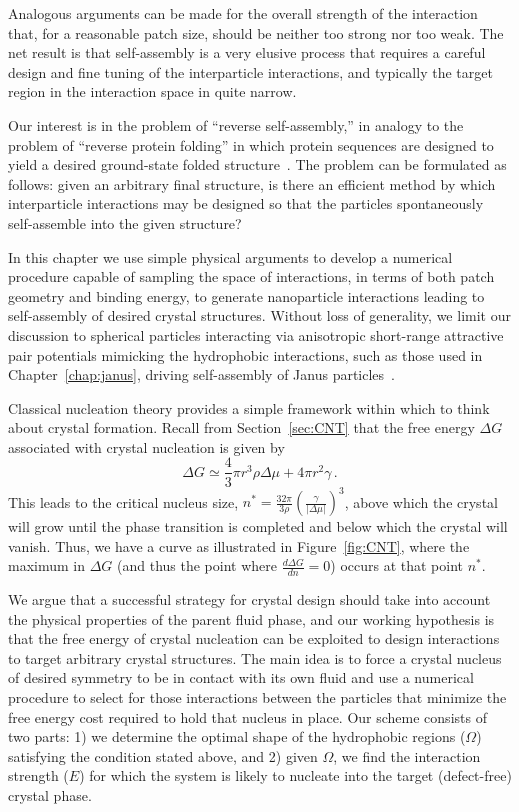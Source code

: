 Analogous arguments can be made for the overall strength of the interaction that, for a reasonable patch size, should be neither too strong nor too weak.
The net result is that self-assembly is a very elusive process that requires a careful design and fine tuning of the interparticle interactions, and typically the target region in the interaction space in quite narrow.
 
Our interest is in the problem of ``reverse self-assembly,'' in analogy to the problem of ``reverse protein folding'' in which protein sequences are designed to yield a desired ground-state folded structure~\cite{Yue, Deutsch}.
The problem can be formulated as follows: given an arbitrary final structure, is there an efficient method by which interparticle interactions may be designed so that the particles spontaneously self-assemble into the given structure?

In this chapter we use simple physical arguments to develop a numerical procedure capable of sampling the space of interactions, in terms of both patch geometry and binding energy, to generate nanoparticle interactions leading to self-assembly of desired crystal structures.
Without loss of generality, we limit our discussion to spherical particles interacting via anisotropic short-range attractive pair potentials mimicking the hydrophobic interactions, such as those used in Chapter~\ref{chap:janus}, driving self-assembly of Janus particles~\cite{Hong2, cacciuto}.    
 
Classical nucleation theory provides a simple framework within which to think about crystal formation.
Recall from Section~\ref{sec:CNT} that the free energy $\Delta G$ associated with crystal nucleation is given by
\begin{equation}\Delta G \simeq \frac{4}{3} \pi r^3 \rho \Delta \mu + 4 \pi r^2 \gamma \,.\end{equation}
This leads to the critical nucleus size, $n^* = \frac{32 \pi}{3 \rho}\left(\frac{\gamma}{\left|\Delta \mu\right|}\right)^3$, above which the crystal will grow until the phase transition is completed and below which the crystal will vanish.
Thus, we have a curve as illustrated in Figure~\ref{fig:CNT}, where the maximum in $\Delta G$ (and thus the point where $\frac{d\Delta G}{d n} = 0$) occurs at that point $n^*$.

We argue that a successful strategy for crystal design should take into account the physical properties of the parent fluid phase, and our working hypothesis is that the free energy of crystal nucleation can be exploited to design interactions to target arbitrary crystal structures.  
The main idea is to force a crystal nucleus of desired symmetry to be in contact with its own fluid and use a numerical procedure to select for those interactions between the particles that minimize the free energy cost required to hold that nucleus in place.
Our scheme consists of two parts: 1) we determine  the optimal shape of the hydrophobic regions ($\Omega$) satisfying the condition stated above, and 2) given $\Omega$, we find  the interaction strength ($E$) for which the system is likely to nucleate into the target (defect-free) crystal phase.  

